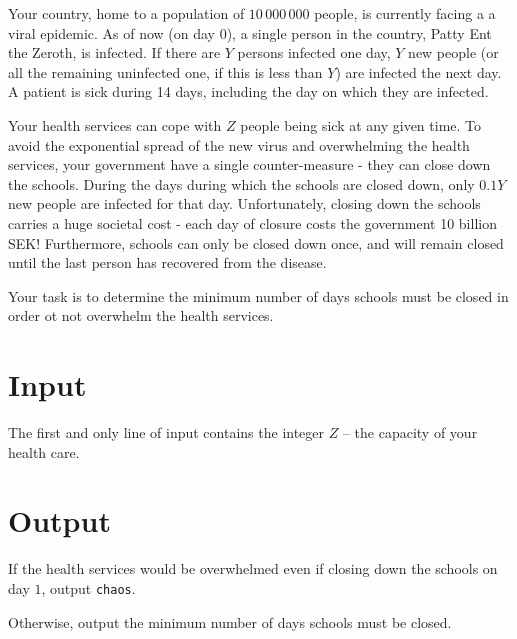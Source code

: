 Your country, home to a population of $10\,000\,000$ people, is currently facing a a viral epidemic.
As of now (on day $0$), a single person in the country, Patty Ent the Zeroth, is infected.
If there are $Y$ persons infected one day, $Y$ new people (or all the remaining uninfected one, if this is less than $Y$) are infected the next day.
A patient is sick during 14 days, including the day on which they are infected.

Your health services can cope with $Z$ people being sick at any given time.
To avoid the exponential spread of the new virus and overwhelming the health services, your government have a single counter-measure - they can close down the schools.
During the days during which the schools are closed down, only $0.1Y$ new people are infected for that day.
Unfortunately, closing down the schools carries a huge societal cost - each day of closure costs the government 10 billion SEK!
Furthermore, schools can only be closed down once, and will remain closed until the last person has recovered from the disease.

Your task is to determine the minimum number of days schools must be closed in order ot not overwhelm the health services.

\section*{Input}
The first and only line of input contains the integer $Z$ -- the capacity of your health care.

\section*{Output}
If the health services would be overwhelmed even if closing down the schools on day $1$, output \texttt{chaos}.

Otherwise, output the minimum number of days schools must be closed.
